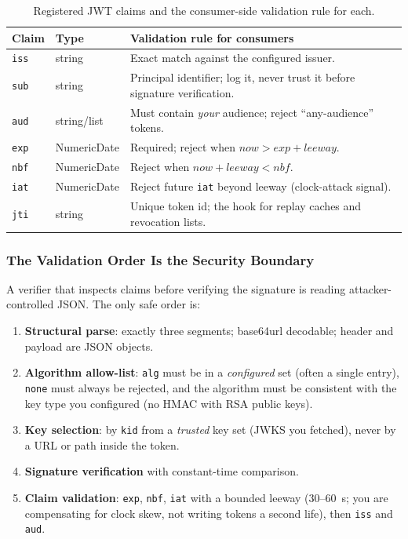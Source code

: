 \begin{table}[ht]
\centering\small
\begin{tabularx}{\textwidth}{l l X}
\toprule
\textbf{Claim} & \textbf{Type} & \textbf{Validation rule for consumers} \\
\midrule
\texttt{iss} & string & Exact match against the configured issuer. \\
\texttt{sub} & string & Principal identifier; log it, never trust it before signature verification. \\
\texttt{aud} & string/list & Must contain \emph{your} audience; reject ``any-audience'' tokens. \\
\texttt{exp} & NumericDate & Required; reject when $\textit{now} > \textit{exp} + \textit{leeway}$. \\
\texttt{nbf} & NumericDate & Reject when $\textit{now} + \textit{leeway} < \textit{nbf}$. \\
\texttt{iat} & NumericDate & Reject future \texttt{iat} beyond leeway (clock-attack signal). \\
\texttt{jti} & string & Unique token id; the hook for replay caches and revocation lists. \\
\bottomrule
\end{tabularx}
\caption{Registered JWT claims and the consumer-side validation rule for each.}
\label{tab:ch5-claims}
\end{table}

\subsubsection{The Validation Order Is the Security Boundary}

A verifier that inspects claims before verifying the signature is reading
attacker-controlled JSON. The only safe order is:

\begin{enumerate}
  \item \textbf{Structural parse}: exactly three segments; base64url
        decodable; header and payload are JSON objects.
  \item \textbf{Algorithm allow-list}: \texttt{alg} must be in a
        \emph{configured} set (often a single entry), \texttt{none} must
        always be rejected, and the algorithm must be consistent with the
        key type you configured (no HMAC with RSA public keys).
  \item \textbf{Key selection}: by \texttt{kid} from a \emph{trusted} key
        set (JWKS you fetched), never by a URL or path inside the token.
  \item \textbf{Signature verification} with constant-time comparison.
  \item \textbf{Claim validation}: \texttt{exp}, \texttt{nbf},
        \texttt{iat} with a bounded leeway (30--60~s; you are compensating
        for clock skew, not writing tokens a second life), then
        \texttt{iss} and \texttt{aud}.
\end{enumerate}

